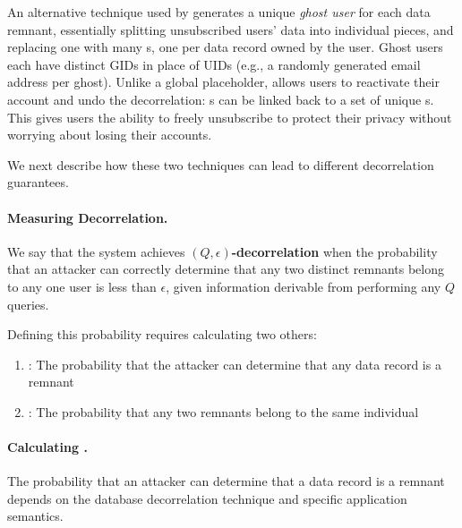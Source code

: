 An alternative technique used by \sys{} generates a unique \emph{ghost user} for each data remnant,
essentially splitting unsubscribed users' data into individual pieces, and replacing one
\uidkey{} with many \gidkey{}s, one per data record owned by the user. Ghost users each have
distinct GIDs in place of UIDs (e.g., a randomly generated email
address per ghost).  Unlike a global placeholder, \sys{} allows users to reactivate their account and
undo the decorrelation: \uidkey{}s can be linked back to a set of unique \gidkey{}s.
This gives users the ability to freely unsubscribe to protect their privacy without worrying about
losing their accounts.   

We next describe how these two techniques can lead to different decorrelation guarantees.

\paragraph{Measuring Decorrelation.} 
We say that the system achieves \textbf{$(Q, \epsilon)$-decorrelation} when the probability that an
attacker can correctly determine that any two distinct remnants belong to any one user is less than
$\epsilon$, given information derivable from performing any $Q$ queries.  

Defining this probability requires calculating two others: \begin{enumerate}
    \item[\premnant{}]: 
        The probability that the attacker can determine that any data record is a remnant
    \item[\plinked{}]:
        The probability that any two remnants belong to the same individual
\end{enumerate}


\paragraph{Calculating \premnant{}.}
The probability that an attacker can determine that a data record is a remnant depends on the
database decorrelation technique and specific application semantics.

